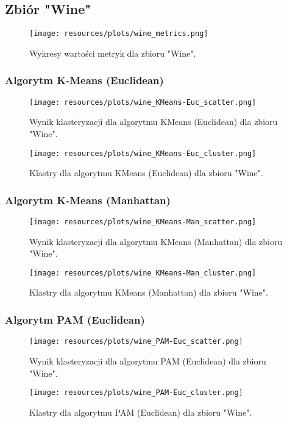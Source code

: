 \subsection{Zbiór "Wine"}
  \begin{figure}[H]
    \center
    \texttt{[image: resources/plots/wine\_metrics.png]}
    \caption{Wykresy wartości metryk dla zbioru "Wine".}
  \end{figure}

  

  \subsubsection{Algorytm K-Means (Euclidean)} 
    \begin{figure}[H]
      \center
      \texttt{[image: resources/plots/wine\_KMeans-Euc\_scatter.png]}
      \caption{Wynik klasteryzacji dla algorytmu KMeans (Euclidean) dla zbioru "Wine".}
    \end{figure}
    \begin{figure}[H]
      \center
      \texttt{[image: resources/plots/wine\_KMeans-Euc\_cluster.png]}
      \caption{Klastry dla algorytmu KMeans (Euclidean) dla zbioru "Wine".}
    \end{figure}

  \subsubsection{Algorytm K-Means (Manhattan)} 
    \begin{figure}[H]
      \center
      \texttt{[image: resources/plots/wine\_KMeans-Man\_scatter.png]}
      \caption{Wynik klasteryzacji dla algorytmu KMeans (Manhattan) dla zbioru "Wine".}
    \end{figure}
    \begin{figure}[H]
      \center
      \texttt{[image: resources/plots/wine\_KMeans-Man\_cluster.png]}
      \caption{Klastry dla algorytmu KMeans (Manhattan) dla zbioru "Wine".}
    \end{figure}

  \subsubsection{Algorytm PAM (Euclidean)} 
    \begin{figure}[H]
      \center
      \texttt{[image: resources/plots/wine\_PAM-Euc\_scatter.png]}
      \caption{Wynik klasteryzacji dla algorytmu PAM (Euclidean) dla zbioru "Wine".}
    \end{figure}
    \begin{figure}[H]
      \center
      \texttt{[image: resources/plots/wine\_PAM-Euc\_cluster.png]}
      \caption{Klastry dla algorytmu PAM (Euclidean) dla zbioru "Wine".}
    \end{figure}

